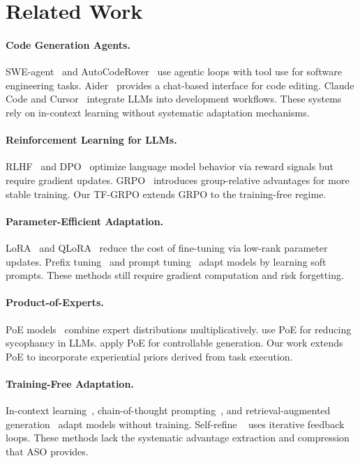 \section{Related Work}

\label{sec:related}

\paragraph{Code Generation Agents.}
SWE-agent~\cite{yang2024sweagent} and AutoCodeRover~\cite{zhang2024autocoderover}
use agentic loops with tool use for software engineering tasks.
Aider~\cite{aider2024} provides a chat-based interface for code editing.
Claude Code and Cursor~\cite{cursor2024} integrate LLMs into development
workflows. These systems rely on in-context learning without systematic
adaptation mechanisms.

\paragraph{Reinforcement Learning for LLMs.}
RLHF~\cite{ouyang2022training} and DPO~\cite{rafailov2024direct} optimize
language model behavior via reward signals but require gradient updates.
GRPO~\cite{shao2024deepseekmath} introduces group-relative advantages for
more stable training. Our TF-GRPO extends GRPO to the training-free regime.

\paragraph{Parameter-Efficient Adaptation.}
LoRA~\cite{hu2022lora} and QLoRA~\cite{dettmers2024qlora} reduce the cost
of fine-tuning via low-rank parameter updates. Prefix
tuning~\cite{li2021prefix} and prompt tuning~\cite{lester2021power} adapt
models by learning soft prompts. These methods still require gradient
computation and risk forgetting.

\paragraph{Product-of-Experts.}
PoE models~\cite{hinton2002training} combine expert distributions
multiplicatively. \cite{du2023reducing} use PoE for reducing sycophancy in
LLMs. \cite{liu2024tuning} apply PoE for controllable generation. Our work
extends PoE to incorporate experiential priors derived from task execution.

\paragraph{Training-Free Adaptation.}
In-context learning~\cite{brown2020language}, chain-of-thought
prompting~\cite{wei2022chain}, and retrieval-augmented
generation~\cite{lewis2020retrieval} adapt models without training. Self-refine
~\cite{madaan2023selfrefine} uses iterative feedback loops. These methods lack
the systematic advantage extraction and compression that ASO provides.

